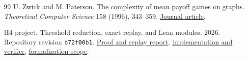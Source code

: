 \documentclass[11pt,letterpaper]{article}
\begin{document}
\begin{thebibliography}{99}
U. Zwick and M. Paterson. The complexity of mean payoff games on graphs.
\emph{Theoretical Computer Science} 158 (1996), 343--359.
\href{https://doi.org/10.1016/0304-3975(95)00188-3}{Journal article}.

H4 project. Threshold reduction, exact replay, and Lean modules, 2026.
Repository revision \texttt{b72f00b1}.
\href{https://github.com/robbiemu/bayesian-simple-security-games/blob/b72f00b1bb9aebad757f5260a60b3278b2879f0c/notes/H4-ssg-to-mean-payoff.md}{Proof and replay report},
\href{https://github.com/robbiemu/bayesian-simple-security-games/blob/b72f00b1bb9aebad757f5260a60b3278b2879f0c/experiments/h4_ssg_to_mpg_replay.py}{implementation and verifier},
\href{https://github.com/robbiemu/bayesian-simple-security-games/blob/b72f00b1bb9aebad757f5260a60b3278b2879f0c/lean/README.md}{formalization scope}.

\end{thebibliography}
\end{document}
